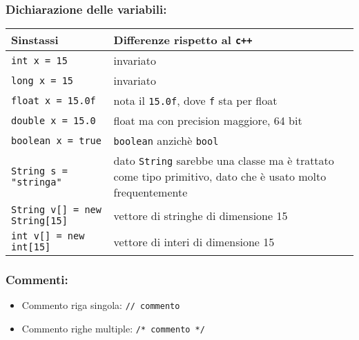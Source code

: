 \subsubsection{Dichiarazione delle variabili:}
\begin{center}
	\begin{tabularx}{\linewidth}{lX}
		\toprule
		Sinstassi                          & Differenze rispetto al \verb|c++|                                                                              \\
		\midrule
		\verb|int x = 15|                  & invariato                                                                                                      \\

		\verb|long x = 15|                 & invariato                                                                                                      \\

		\verb|float x = 15.0f|             & nota il \verb|15.0f|, dove \verb|f| sta per float                                                              \\

		\verb|double x = 15.0|             & float ma con precision maggiore, 64 bit                                                                        \\

		\verb|boolean x = true|            & \verb|boolean| anzichè \verb|bool|                                                                             \\

		\verb|String s = "stringa"|        & dato \verb|String| sarebbe una classe ma è trattato come tipo primitivo, dato che è usato molto frequentemente \\

		\verb|String v[] = new String[15]| & vettore di stringhe di dimensione 15                                                                           \\

		\verb|int v[] = new int[15]|       & vettore di interi di dimensione 15                                                                             \\
		\bottomrule
	\end{tabularx}
\end{center}
\subsubsection{ Commenti:}
\begin{itemize}
	\item Commento riga singola: \verb|// commento|
	\item Commento righe multiple: \verb|/* commento */|
\end{itemize}
